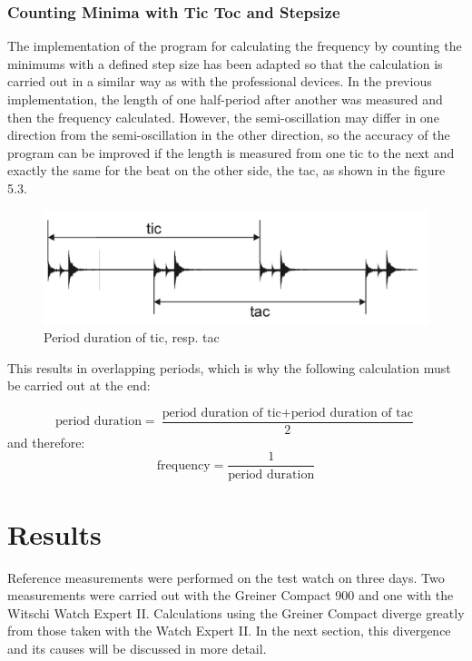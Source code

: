 \documentclass[12pt, a4paper]{report}
\begin{document}
    \subsection{Counting Minima with Tic Toc and Stepsize}
  The implementation of the program for calculating the frequency by counting the minimums with a defined step size has been adapted so that the calculation is carried out in a similar way as with the professional devices. In the previous implementation, the length of one half-period after another was measured and then the frequency calculated. However, the semi-oscillation may differ in one direction from the semi-oscillation in the other direction, so the accuracy of the program can be improved if the length is measured from one tic to the next and exactly the same for the beat on the other side, the tac, as shown in the figure 5.3. 
       \noindent
    \begin{figure}[H]
        \centering
        \includegraphics[scale=0.4]{Images/gangdeviation.png}
    
    \caption{Period duration of tic, resp. tac}
    \end{figure}    
  
  This results in overlapping periods, which is why the following calculation must be carried out at the end:
  
       \begin{displaymath}
     \text{period duration} = \frac{\text{period duration of tic} + \text{period duration of tac}}{2} 
     \end{displaymath}
  and therefore: 
       \begin{displaymath}
      \text{frequency}= \frac{1}{\text{period duration}}
     \end{displaymath}
     
    
    \chapter{Results}
        Reference measurements were performed on the test watch on three days. Two measurements were carried out with the Greiner Compact 900 and one with the Witschi Watch Expert II. Calculations using the Greiner Compact diverge greatly from those taken with the Watch Expert II. In the next section, this divergence and its causes will be discussed in more detail. 
\end{document}
